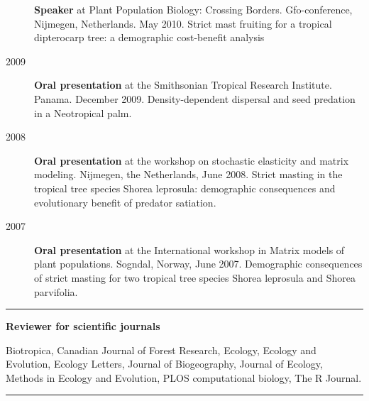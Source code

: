 \documentclass[b5paper,justified]{tufte-book} %
\begin{document}
\begin{fullwidth}
\begin{description}
\textbf{Speaker} at Plant Population Biology: Crossing Borders.
Gfo-conference, Nijmegen, Netherlands. May 2010. Strict mast fruiting
for a tropical dipterocarp tree: a demographic cost-benefit analysis
\item[2009]
\textbf{Oral presentation} at the Smithsonian Tropical Research
Institute. Panama. December 2009. Density-dependent dispersal and seed
predation in a Neotropical palm.
\item[2008]
\textbf{Oral presentation} at the workshop on stochastic elasticity and
matrix modeling. Nijmegen, the Netherlands, June 2008. Strict masting in
the tropical tree species Shorea leprosula: demographic consequences and
evolutionary benefit of predator satiation.
\item[2007]
\textbf{Oral presentation} at the International workshop in Matrix
models of plant populations. Sogndal, Norway, June 2007. Demographic
consequences of strict masting for two tropical tree species Shorea
leprosula and Shorea parvifolia.
\end{description}

\begin{center}\rule{0.5\linewidth}{\linethickness}\end{center}

\vspace{1cm}
\Large \textbf{Reviewer for scientific journals}
\vspace{1cm}

\footnotesize

Biotropica, Canadian Journal of Forest Research, Ecology, Ecology and
Evolution, Ecology Letters, Journal of Biogeography, Journal of Ecology,
Methods in Ecology and Evolution, PLOS computational biology, The R
Journal.

\begin{center}\rule{0.5\linewidth}{\linethickness}\end{center}

\end{fullwidth}
\end{document}
